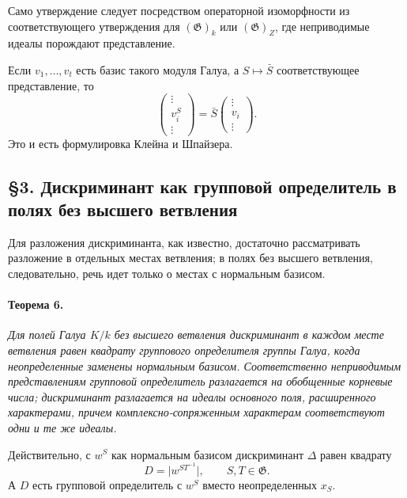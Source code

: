 \documentclass[11pt]{article}
\providecommand{\Gg}{\mathfrak{G}}
\begin{document}
Само утверждение следует посредством операторной изоморфности из соответствующего утверждения для \((\Gg)_k\) или \((\Gg)_Z\), где неприводимые идеалы порождают представление.

Если \(v_1,\ldots,v_t\) есть базис такого модуля Галуа, а \(S\mapsto \bar S\) соответствующее представление, то
\[
        \begin{pmatrix}\vdots\\ v_i^S\\ \vdots\end{pmatrix}
        =\bar S\begin{pmatrix}\vdots\\ v_i\\ \vdots\end{pmatrix}.
\]
Это и есть формулировка Клейна и Шпайзера.

\subsection*{§3. Дискриминант как групповой определитель в полях без высшего ветвления}

Для разложения дискриминанта, как известно, достаточно рассматривать разложение в отдельных местах ветвления; в полях без высшего ветвления, следовательно, речь идет только о местах с нормальным базисом.

\paragraph{Теорема 6.}
\emph{Для полей Галуа \(K/k\) без высшего ветвления дискриминант в каждом месте ветвления равен квадрату группового определителя группы Галуа, когда неопределенные заменены нормальным базисом. Соответственно неприводимым представлениям групповой определитель разлагается на обобщенные корневые числа; дискриминант разлагается на идеалы основного поля, расширенного характерами, причем комплексно-сопряженным характерам соответствуют одни и те же идеалы.}

Действительно, с \(w^S\) как нормальным базисом дискриминант \(\Delta\) равен квадрату
\[
        D=\bigl|w^{ST^{-1}}\bigr|,\qquad S,T\in\Gg.
\]
А \(D\) есть групповой определитель с \(w^S\) вместо неопределенных \(x_S\).
\end{document}
